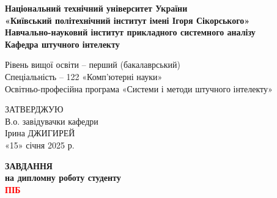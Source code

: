 \thispagestyle{empty}
\begin{center}
\textbf{
Національний технічний університет України\\
«Київський політехнічний інститут імені Ігоря Сікорського»\\
Навчально-науковий інститут прикладного системного аналізу\\
Кафедра штучного інтелекту\\
}
\end{center}

\noindent
Рівень вищої освіти – перший (бакалаврський)\\
Спеціальність -- 122 «Комп'ютерні науки»\\
Освітньо-професійна програма «Системи і методи штучного інтелекту»\\

\vspace{1em}

\hfill
\begin{minipage}{0.4\textwidth}
ЗАТВЕРДЖУЮ\\
В.о. завідувачки кафедри\\
\underline{\hspace{2cm}} Ірина ДЖИГИРЕЙ\\
«15» січня 2025 р.
\end{minipage}

\vspace{2em}

\begin{center}
    \textbf{ЗАВДАННЯ\\на дипломну роботу студенту\\\textcolor{red}{ПІБ}}
\end{center}

\newcommand{\makeshiftedemun}[1]{#1.}%
\newenvironment{shiftedemun}
  {\begin{list}
    {\arabic{boxlblcounter}}
    {\usecounter{boxlblcounter}
     \setlength{\labelwidth}{-0.5em}
     \setlength{\labelsep}{0.5em}
     \setlength{\itemsep}{2pt}
     \setlength{\leftmargin}{0cm}
     \setlength{\rightmargin}{0cm}
     \setlength{\itemindent}{0em} 
     \let\makelabel=\makeshiftedemun
    }
  }
{\end{list}}

